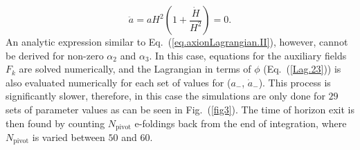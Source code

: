 \documentclass[a4paper,11pt]{article}
\begin{document}
  \begin{equation}
    \ddot{a} = a H^2 \left(1 + \frac{\dot H}{H^2} \right) = 0.
  \end{equation}
  An analytic expression similar to Eq.~(\ref{eq.axionLagrangian.II}), however,  cannot be derived  for  non-zero $\alpha_2$ and $\alpha_3$. In this case,  equations for the auxiliary fields $F_k$ are  solved numerically,  and the Lagrangian in terms of $\phi$ (Eq.~(\ref{Lag.23})) is
  also evaluated numerically for each set of values for ($a_-$, $\dot a_-$).  
   This process is significantly slower, therefore, in this case the simulations are only done for $29$ sets of parameter values as can be seen in Fig.~(\ref{fig3}). 
    The time of horizon exit is then found by counting $N_\text{pivot}$ e-foldings back from the end of integration, where $N_\text{pivot}$ is varied between $50$ and $60$. 
\end{document}
